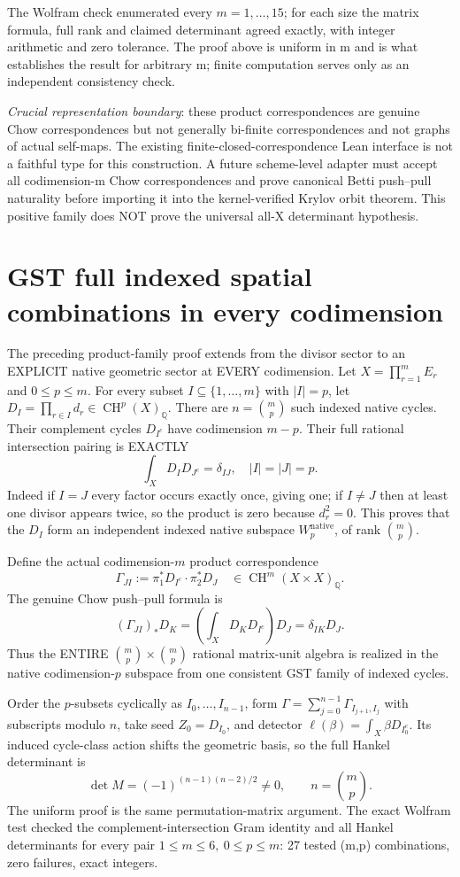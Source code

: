 \documentclass[11pt]{article}
\newcommand{\Q}{\mathbb Q}
\newcommand{\CH}{\operatorname{CH}}
\begin{document}
The Wolfram check enumerated every \(m=1,\ldots,15\);
for each size the matrix formula, full rank and claimed determinant
agreed exactly, with integer arithmetic and zero tolerance. The
proof above is uniform in m and is what establishes the result
for arbitrary m; finite computation serves only as an independent
consistency check.

\emph{Crucial representation boundary}: these product
correspondences are genuine Chow correspondences but not generally
bi-finite correspondences and not graphs of actual self-maps.
The existing finite-closed-correspondence Lean interface is not a
faithful type for this construction. A future scheme-level adapter
must accept all codimension-m Chow correspondences and prove
canonical Betti push--pull naturality before importing it into
the kernel-verified Krylov orbit theorem. This positive family
does NOT prove the universal all-X determinant hypothesis.


\section{GST full indexed spatial combinations in every codimension}
The preceding product-family proof extends from the divisor sector
to an EXPLICIT native geometric sector at EVERY codimension.
Let \(X=\prod_{r=1}^{m}E_r\) and \(0\le p\le m\).
For every subset \(I\subseteq\{1,\ldots,m\}\) with \(|I|=p\),
let \(D_I=\prod_{r\in I}d_r\in\CH^p(X)_\Q\).
There are \(n=\binom mp\) such indexed native cycles.
Their complement cycles \(D_{I^c}\) have codimension \(m-p\).
Their full rational intersection pairing is EXACTLY
\[
\int_X D_I D_{J^c}=\delta_{IJ},
\quad |I|=|J|=p.
\]
Indeed if \(I=J\) every factor occurs exactly once, giving
one; if \(I\ne J\) then at least one divisor appears twice,
so the product is zero because \(d_r^2=0\).
This proves that the \(D_I\) form an independent indexed
native subspace \(W_p^{\mathrm{native}}\), of rank \(\binom mp\).

Define the actual codimension-\(m\) product correspondence
\[
\Gamma_{JI}:=\pi_1^*D_{I^c}\cdot\pi_2^*D_J
\quad\in\CH^m(X\times X)_\Q.
\]
The genuine Chow push--pull formula is
\[
(\Gamma_{JI})_*D_K
=\left(\int_X D_KD_{I^c}\right)D_J
=\delta_{IK}D_J.
\]
Thus the ENTIRE \(\binom mp\times\binom mp\) rational
matrix-unit algebra is realized in the native codimension-\(p\)
subspace from one consistent GST family of indexed cycles.

Order the \(p\)-subsets cyclically as
\(I_0,\ldots,I_{n-1}\), form
\(\Gamma=\sum_{j=0}^{n-1}\Gamma_{I_{j+1},I_j}\)
with subscripts modulo \(n\), take seed \(Z_0=D_{I_0}\),
and detector \(\ell(\beta)=\int_X\beta D_{I_0^c}\).
Its induced cycle-class action shifts the geometric basis,
so the full Hankel determinant is
\[
\boxed{\det M=(-1)^{(n-1)(n-2)/2}\ne0,
\qquad n=\binom mp.}
\]
The uniform proof is the same permutation-matrix argument.
The exact Wolfram test checked the complement-intersection
Gram identity and all Hankel determinants for every pair
\(1\le m\le6,\ 0\le p\le m\): 27 tested (m,p) combinations,
zero failures, exact integers.
\end{document}
